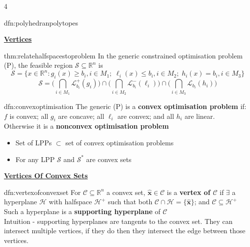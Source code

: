 \documentclass[landscape, 8pt]{extarticle}
\begin{document}
\begin{multicols*}{4}
\begin{dfn}{dfn:polyhedranpolytopes}{ }
		\end{dfn}
		
		
		



{\footnotesize \textbf{\underline{Vertices}}}
		
		
		
		\begin{thm}{thm:relatehalfspacestoproblem}{ }
			In the generic constrained optimisation problem (P), the feasible region $\mathcal{S} \subseteq \mathbb{R}^n$ is 
			$$
			\mathcal{S} = \{x\in \mathbb{R}^n : g_i(x) \ge b_i, i\in M_1;\; \ell_i(x) \le b_i, i\in M_2; \; h_i(x)=b_i, i\in M_3\}
			$$$$
			\mathcal{S} = \bigg(\bigcap_{i\in M_1} \mathcal{L}^+_{b_i}(g_i)\bigg) \cap \bigg(\bigcap_{i\in M_2} \mathcal{L}_{b_i}^-(\ell_i)\bigg) \cap \bigg(\bigcap_{i\in M_3}\mathcal{L}_{b_i}(h_i)\bigg)
			$$
			
		\end{thm}
		
		
		\begin{mdfn}{dfn:convexoptimisation}{ }
			The generic (P) is a \textbf{convex optimisation problem} if: $f$ is convex; all $g_i$ are concave; all $\ell_i$ are convex; and all $h_i$ are linear.\\
			Otherwise it is a \textbf{nonconvex optimisation problem}
			\begin{itemize}
				\item Set of LPPs $\subset$ set of convex optimisation problems
				\item For any LPP $\mathcal{S}$ and $\mathcal{S}^*$ are convex sets
			\end{itemize}
			
		\end{mdfn}
		
		
	{\tiny\textbf{\underline{Vertices Of Convex Sets}}}
		
		\begin{mdfn}{dfn:vertexofconvexset}{ }
			For $\mathcal{C} \subseteq\mathbb{R}^n$ a convex set, $\mathbf{\hat{x}}\in \mathcal{C}$ is a \textbf{vertex of $\mathcal{C}$} if $\exists$ a hyperplane $\mathcal{H}$ with halfspace $\mathcal{H}^+$ such that both $\mathcal{C} \cap \mathcal{H} = \{\mathbf{\hat{x}}\}$; and $\mathcal{C} \subseteq \mathcal{H}^+$
			Such a hyperplane is a \textbf{supporting hyperplane} of $\mathcal{C}$\\
			Intuition - supporting hyperplanes are tangents to the convex set. They can intersect multiple vertices, if they do then they intersect the edge between those vertices.
			

\end{mdfn}
\end{multicols*}
\end{document}

